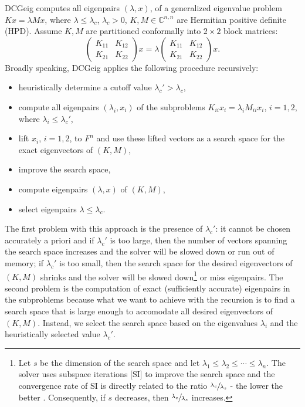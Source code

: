 \documentclass[%
	paper=a4,
	fontsize=10pt,
	DIV11,BCOR10mm,
	numbers=noenddot,
	abstract=yes
]{scrartcl}
\newcommand{\F}{\mathbb{C}}
\theoremstyle{definition}
\begin{document}
DCGeig computes all eigenpairs $(\lambda, x)$, of a generalized eigenvalue
problem $Kx = \lambda Mx$, where $\lambda \leq \lambda_c$, $\lambda_c > 0$, $K,
M \in \F^{n,n}$ are Hermitian positive definite (HPD). Assume $K, M$ are
partitioned conformally into $2 \times 2$ block matrices:
\[
	\begin{pmatrix} K_{11} & K_{12} \\ K_{21} & K_{22} \end{pmatrix}
	x
	= \lambda \begin{pmatrix} K_{11} & K_{12} \\ K_{21} & K_{22} \end{pmatrix}x.
\]
Broadly speaking, DCGeig applies the following procedure recursively:
\begin{itemize}
	\item heuristically determine a cutoff value $\lambda_c' > \lambda_c$,
	\item compute all eigenpairs $(\lambda_i, x_i)$ of the subproblems
		$K_{ii} x_i = \lambda_i M_{ii} x_i$, $i = 1, 2$, where
		$\lambda_i \leq \lambda_c'$,
	\item lift $x_i$, $i = 1, 2$, to $F^n$ and use these lifted vectors as
		a search space for the exact eigenvectors of $(K, M)$,
	\item improve the search space,
	\item compute eigenpairs $(\lambda, x)$ of $(K, M)$,
	\item select eigenpairs $\lambda \leq \lambda_c$.
\end{itemize}
The first problem with this approach is the presence of $\lambda_c'$: it cannot
be chosen accurately a priori and if $\lambda_c'$ is too large, then the number
of vectors spanning the search space increases and the solver will be slowed
down or run out of memory; if $\lambda_c'$ is too small, then the search space
for the desired eigenvectors of $(K, M)$ shrinks and the solver will be slowed
down\footnote{Let $s$ be the dimension of the search space and let $\lambda_1
\leq \lambda_2 \leq \dotsb \leq \lambda_n$. The solver uses subspace iterations
[SI] to improve the search space and the convergence rate of SI is directly
related to the ratio $\sfrac{\lambda_c}{\lambda_s}$ - the lower the better
\cite[§5.2]{Saad2011}. Consequently, if $s$ decreases, then
$\sfrac{\lambda_c}{\lambda_s}$ increases.} or miss eigenpairs. The second
problem is the computation of exact (sufficiently accurate) eigenpairs in the
subproblems because what we want to achieve with the recursion is to find a
search space that is large enough to accomodate all desired eigenvectors of $(K,
M)$. Instead, we select the search space based on the eigenvalues $\lambda_i$
and the heuristically selected value $\lambda_c'$.
\end{document}
